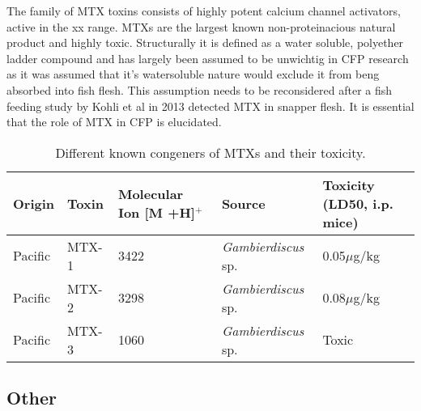 \documentclass[12pt]{article}
\begin{document}
The family of MTX toxins consists of highly potent calcium channel activators, active in the xx range.  MTXs are the largest known non-proteinacious natural product and highly toxic. Structurally it is defined as a water soluble, polyether ladder compound and has largely been assumed to be unwichtig in CFP research as it was assumed that it's watersoluble nature would exclude it from beng absorbed into fish flesh. This assumption needs to be reconsidered after a fish feeding study by Kohli et al in 2013 detected MTX in  snapper flesh. It is essential that the role of MTX in CFP is elucidated. 

\begin{sidewaystable}[!htbp]
\caption{Different known congeners of MTXs and their toxicity.}
\begin{tabular}{ |  p{4cm} | p{4cm} | p{4cm} | p{4cm} | p{4cm} | }
\hline
\textbf{Origin} & \textbf{Toxin} & \textbf{Molecular Ion [M +H]$^{+}$} & \textbf{Source} & \textbf{Toxicity (LD50, i.p. mice)} \\
\hline
 Pacific & MTX-1 & 3422 \cite{holmes1994purification,murata1993structure} & \emph{Gambierdiscus} sp. \cite{holmes1994purification} & 0.05$\mu$g/kg \cite{murata1993structure}\\
\hline
 Pacific & MTX-2 & 3298 \cite{holmes1994purification} & \emph{Gambierdiscus} sp. \cite{holmes1994purification} & 0.08$\mu$g/kg \cite{holmes1994purification}\\
\hline
 Pacific & MTX-3 & 1060   \cite{holmes1994purification} & \emph{Gambierdiscus} sp. \cite{holmes1994purification} & Toxic \cite{holmes1994purification} \\
\hline
\end{tabular}
\end{sidewaystable}
\FloatBarrier

\subsection{Other}
\end{document}
